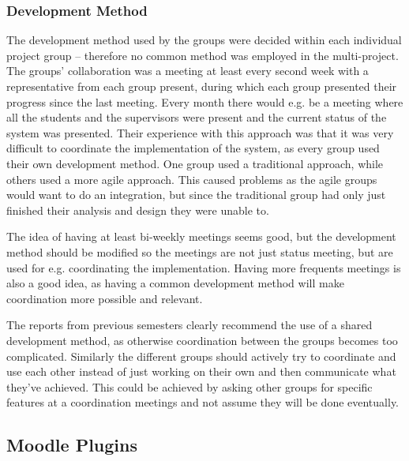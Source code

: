 \subsubsection{Development Method}
The development method used by the groups were decided within each individual project group -- therefore no common method was employed in the multi-project.
The groups' collaboration was a meeting at least every second week with a representative from each group present, during which each group presented their progress since the last meeting.
Every month there would	e.g. be a meeting where all the students and the supervisors were present and the current status of the system was presented.
Their experience with this approach was that it was very difficult to coordinate the implementation of the system, as every group used their own development method. 
One group used a traditional approach, while others used a more agile approach.
This caused problems as the agile groups would want to do an integration, but since the traditional group had only just finished their analysis and design they were unable to.

The idea of having at least bi-weekly meetings seems good, but the development method should be modified so the meetings are not just status meeting, but are used for e.g. coordinating the implementation.
Having more frequents meetings is also a good idea, as having a common development method will make coordination more possible and relevant.

The reports from previous semesters clearly recommend the use of a shared development method, as otherwise coordination between the groups becomes too complicated. Similarly the different groups should actively try to coordinate and use each other instead of just working on their own and then communicate what they've achieved. 
This could be achieved by asking other groups for specific features at a coordination meetings and not assume they will be done eventually.


\subsection{Moodle Plugins}



